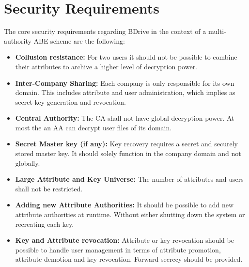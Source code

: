 \documentclass[twocolumn]{article}
\begin{document}
\section{Security Requirements}
\label{sec:securityRequirements}
The core security requirements regarding BDrive in the context of a multi-authority ABE scheme are the following:
\begin{itemize}
\item \textbf{Collusion resistance:} For two users it should not be possible to combine their attributes to archive a higher level of decryption power.
\item \textbf{Inter-Company Sharing:} Each company is only responsible for its own domain. This includes attribute and user administration, which implies as secret key generation and revocation. %
\item \textbf{Central Authority:} The CA shall not have global decryption power. At most the an AA can decrypt user files of its domain.  
\item \textbf{Secret Master key (if any):} Key recovery requires a secret and securely stored master key. It should solely function in the company domain and not globally. 
\item \textbf{Large Attribute and Key Universe:} The number of attributes and users shall not be restricted.
\item \textbf{Adding new Attribute Authorities:} It should be possible to add new attribute authorities at runtime. Without either shutting down the system or recreating each key.
\item \textbf{Key and Attribute revocation:} Attribute or key revocation should be possible to handle user management in terms of attribute promotion, attribute demotion and key revocation. Forward secrecy should be provided. 
\end{itemize}
\end{document}
